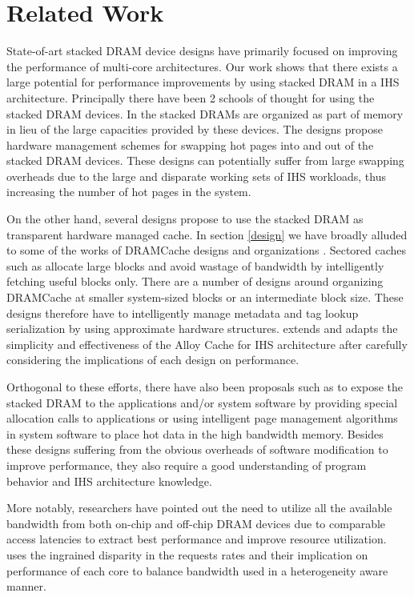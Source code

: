 \section{Related Work} \label{related-work}
State-of-art stacked DRAM device designs have primarily focused on improving the performance of multi-core architectures. Our work shows that there exists a large potential for performance improvements by using stacked DRAM in a IHS architecture. Principally there have been 2 schools of thought for using the stacked DRAM devices. In \cite{pom,cameo} the stacked DRAMs are organized as part of memory in lieu of the large capacities provided by these devices. The designs propose hardware management schemes for swapping hot pages into and out of the stacked DRAM devices. These designs can potentially suffer from large swapping overheads due to the large and disparate working sets of IHS workloads, thus increasing the number of hot pages in the system.
\par On the other hand, several designs propose to use the stacked DRAM as transparent hardware managed cache. In section \ref{design} we have broadly alluded to some of the works of DRAMCache designs and organizations \cite{alloy,atcache,bimodal,loh-hill}. Sectored caches such as \cite{footprint,unison-cache} allocate large blocks and avoid wastage of bandwidth by intelligently fetching useful blocks only. There are a number of designs around organizing DRAMCache at smaller system-sized blocks or an intermediate block size. These designs therefore have to intelligently manage metadata and tag lookup serialization by using approximate hardware structures. \cachename extends and adapts the simplicity and effectiveness of the Alloy Cache for IHS architecture after carefully considering the implications of each design on performance.
\par Orthogonal to these efforts, there have also been proposals such as \cite{software-dram} to expose the stacked DRAM to the applications and/or system software by providing special allocation calls to applications or using intelligent page management algorithms in system software to place hot data in the high bandwidth memory. Besides these designs suffering from the obvious overheads of software modification to improve performance, they also require a good understanding of program behavior and IHS architecture knowledge.
\par More notably, researchers have pointed out the need to utilize all the available bandwidth from both on-chip and off-chip DRAM devices due to comparable access latencies \cite{mostly-clean,mainak-hpca} to extract best performance and improve resource utilization. \cachename uses the ingrained disparity in the requests rates and their implication on performance of each core to balance bandwidth used in a heterogeneity aware manner.
